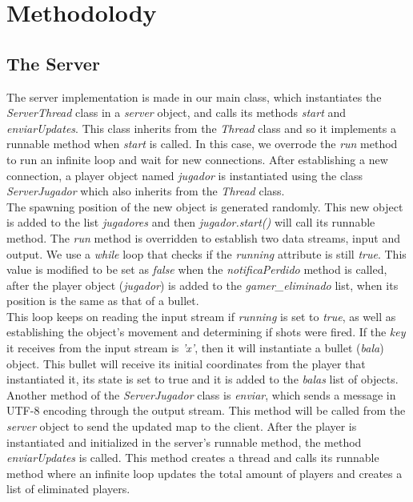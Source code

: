 \documentclass[10pt,a4paper]{article}
\theoremstyle{definition}
\begin{document}
\section{Methodolody}
\subsection{The Server}
The server implementation is made in our main class, which instantiates the \textit{ServerThread} class in a \textit{server} object, and calls its methods \textit{start} and \textit{enviarUpdates}. 
This class inherits from the \textit{Thread} class and so it implements a runnable method when \textit{start} is called. 
In this case, we overrode the \textit{run} method to run an infinite loop and wait for new connections. 
After establishing a new connection, a player object named \textit{jugador} is instantiated using the class \textit{ServerJugador} which also inherits from the \textit{Thread} class. \\
The spawning position of the new object is generated randomly. 
This new object is added to the list \textit{jugadores} and then \textit{jugador.start()} will call its runnable method. 
The \textit{run} method is overridden to establish two data streams, input and output. 
We use a \textit{while} loop that checks if the \textit{running} attribute is still \textit{true}. 
This value is modified to be set as \textit{false} when the \textit{notificaPerdido} method is called, after the player object (\textit{jugador}) is added to the \textit{gamer\_eliminado} list, when its position is the same as that of a bullet. \\
This loop keeps on reading the input stream if \textit{running} is set to \textit{true}, as well as establishing the object's movement and determining if shots were fired. 
If the \textit{key} it receives from the input stream is \textit{'x'}, then it will instantiate a bullet (\textit{bala}) object. 
This bullet will receive its initial coordinates from the player that instantiated it, its state is set to true and it is added to the \textit{balas} list of objects. \\
Another method of the \textit{ServerJugador} class is \textit{enviar}, which sends a message in UTF-8 encoding through the output stream. 
This method will be called from the \textit{server} object to send the updated map to the client. 
After the player is instantiated and initialized in the server's runnable method, the method \textit{enviarUpdates} is called. 
This method creates a thread and calls its runnable method where an infinite loop updates the total amount of players and creates a list of eliminated players. 
\end{document}
